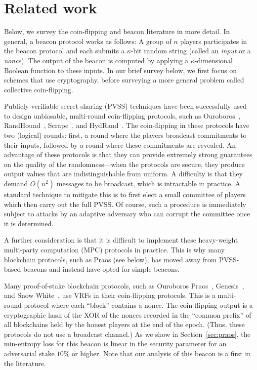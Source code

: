 \section{Related work}\label{sec:praos-related-work}


Below, we survey the coin-flipping and beacon literature in more detail. 
In general, a beacon protocol works as follows: 
A group of $n$ players participates in the beacon protocol 
and each submits a $\kappa$-bit random string (called an \emph{input} or a \emph{nonce}). 
The output of the beacon is computed by applying 
a $\kappa$-dimensional Boolean function to these inputs. 
In our brief survey below, we first focus on schemes that use cryptography, 
before surveying a more general problem called collective coin-flipping.



Publicly verifiable secret sharing (PVSS) techniques have been
successfully used to design unbiasable, multi-round coin-flipping
protocols, such as Ouroboros~\cite{Ouroboros},
RandHound~\cite{RandHound}, Scrape~\cite{Scrape}, and
HydRand~\cite{HydRand}.  The coin-flipping in these protocols have two
(logical) rounds: first, a round where the players broadcast
commitments to their inputs, followed by a round where these
commitments are revealed. An advantage of these protocols is that they
can provide extremely strong guarantees on the quality of the
randomness---when the protocols are secure, they produce output values
that are indistinguishable from uniform. A difficulty is that they
demand $O(n^2)$ messages to be broadcast, which is intractable in
practice. A standard technique to mitigate this is to first elect a small
committee of players which then carry out the full PVSS. Of course,
such a procedure is immediately subject to attacks by an adaptive
adversary who can corrupt the committee once it is determined.

A further consideration is that it is difficult to implement 
these heavy-weight multi-party computation (MPC) protocols in practice. 
This is why many blockchain protocols, 
such as Praos (see below), 
has moved away from PVSS-based beacons and instead 
have opted for simple beacons.



Many proof-of-stake blockchain
protocols, such as Ouroboros Praos~\cite{Praos}, 
Genesis~\cite{Genesis}, and Snow White~\cite {SnowWhite}, 
use VRFs 
in their coin-flipping protocols. 
This is a multi-round protocol 
where each ``block'' contains a nonce.  
The coin-flipping output is a cryptographic hash 
of the XOR of the nonces 
recorded in the ``common prefix'' of all 
blockchains held by the honest players 
at the end of the epoch. 
(Thus, these protocols do not use a broadcast channel.)
As we show in Section~\ref{sec:praos}, 
the min-entropy loss for this beacon 
is linear in the security parameter 
for an adversarial stake $10\%$ or higher.
Note that our analysis of this beacon 
is a first in the literature. 


